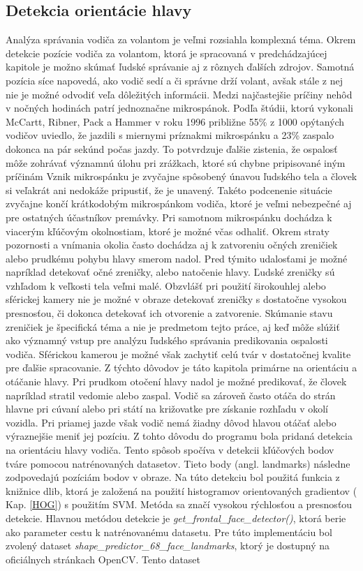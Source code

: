 \documentclass[slovak,master,dept460,male,cpp,cpdeclaration]{diploma}
\begin{document}
\subsection{Detekcia orientácie hlavy}
\label{sec:headOrientation}
Analýza správania vodiča za volantom je  veľmi rozsiahla komplexná téma. Okrem detekcie pozície vodiča za volantom, ktorá je spracovaná v predchádzajúcej kapitole je možno skúmať ľudské správanie aj z rôznych ďalších zdrojov. Samotná pozícia  síce napovedá, ako vodič sedí a či správne drží volant, avšak  stále z nej nie je možné odvodiť veľa dôležitých informácii.  Medzi najčastejšie príčiny nehôd v nočných hodinách patrí jednoznačne mikrospánok. Podľa štúdii\cite{mccartt1996scope}, ktorú vykonali McCartt, Ribner, Pack a Hammer  v roku 1996 približne 55\% z 1000 opýtaných vodičov uviedlo, že jazdili s miernymi príznakmi mikrospánku a 23\% zaspalo dokonca na pár sekúnd počas jazdy. To potvrdzuje ďalšie zistenia, že ospalosť môže zohrávať významnú úlohu pri zrážkach, ktoré sú chybne pripisované iným príčinám Vznik mikrospánku je zvyčajne spôsobený únavou ľudského tela  a človek si veľakrát ani nedokáže pripustiť, že je unavený. Takéto podcenenie situácie zvyčajne končí krátkodobým mikrospánkom  vodiča, ktoré je  veľmi nebezpečné aj pre ostatných účastníkov premávky.  Pri samotnom mikrospánku dochádza  k viacerým kľúčovým okolnostiam, ktoré je možné včas odhaliť. Okrem straty pozornosti a vnímania okolia často dochádza aj k zatvoreniu očných zreničiek alebo prudkému pohybu hlavy smerom nadol. Pred týmito udalosťami je možné napríklad detekovať  očné zreničky, alebo natočenie hlavy. Ľudské zreničky sú vzhľadom  k veľkosti tela veľmi malé. Obzvlášť pri použití širokouhlej alebo sférickej kamery nie je možné v obraze detekovať  zreničky s dostatočne vysokou presnosťou, či dokonca detekovať ich otvorenie a zatvorenie.  Skúmanie stavu zreničiek je špecifická téma a nie je predmetom tejto práce, aj keď môže slúžiť ako významný vstup pre analýzu ľudského správania  predikovania ospalosti vodiča. Sférickou kamerou je možné  však  zachytiť celú tvár v dostatočnej kvalite pre ďalšie spracovanie. Z týchto dôvodov je  táto kapitola  primárne na orientáciu a otáčanie hlavy. Pri prudkom otočení hlavy nadol je možné predikovať, že človek napríklad stratil vedomie alebo zaspal. Vodič sa zároveň často otáča do strán  hlavne pri cúvaní alebo pri  státí na križovatke pre získanie rozhľadu v okolí vozidla.  Pri priamej jazde však vodič nemá žiadny dôvod hlavou otáčať alebo výraznejšie meniť jej pozíciu. Z tohto dôvodu  do programu  bola pridaná detekcia na orientáciu hlavy vodiča. Tento spôsob spočíva v detekcii  kľúčových bodov tváre pomocou natrénovaných datasetov.  Tieto body (angl. landmarks) následne zodpovedajú pozíciám bodov v obraze. Na túto detekciu bol použitá funkcia z knižnice dlib, ktorá je založená na použití histogramov orientovaných gradientov ( Kap. \ref{HOG}) s použitím SVM. Metóda sa značí vysokou rýchlosťou a presnosťou detekcie.  Hlavnou metódou detekcie je \textit{get\_frontal\_face\_detector()}, ktorá berie ako parameter cestu k natrénovanému datasetu. Pre túto implementáciu bol zvolený dataset \textit{shape\_predictor\_68\_face\_landmarks}, ktorý je dostupný na oficiálnych stránkach OpenCV. Tento dataset 
\end{document}
